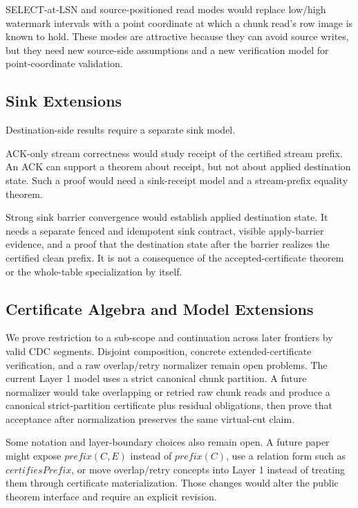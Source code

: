 \documentclass[letterpaper,10pt,twocolumn]{article}
\newcommand{\CleanPrefix}{\mathit{prefix}}
\begin{document}
SELECT-at-LSN and source-positioned read modes would replace low/high
watermark intervals with a point coordinate at which
a chunk read's row image is known to hold. These modes are attractive
because they can avoid source writes, but they need new source-side
assumptions and a new verification model for point-coordinate validation.

\subsection{Sink Extensions}\label{sink-extensions}

Destination-side results require a separate sink model.

ACK-only stream correctness would study receipt of the certified
stream prefix. An ACK can support a theorem about receipt, but not about
applied destination state. Such a proof would need a sink-receipt model
and a stream-prefix equality theorem.

Strong sink barrier convergence would establish applied destination
state. It needs a separate fenced and idempotent sink
contract, visible apply-barrier evidence, and a proof that the
destination state after the barrier realizes the certified clean
prefix. It is not a consequence of the accepted-certificate theorem
or the whole-table specialization by itself.

\subsection{Certificate Algebra and Model
Extensions}\label{certificate-algebra-and-model-extensions}

We prove restriction to a sub-scope and continuation across later
frontiers by valid CDC segments. Disjoint composition, concrete
extended-certificate verification, and a raw overlap/retry normalizer
remain open problems. The current Layer 1 model uses a strict canonical
chunk partition. A future normalizer would take overlapping or retried
raw chunk reads and produce a canonical strict-partition certificate plus
residual obligations, then prove that acceptance after normalization
preserves the same virtual-cut claim.

Some notation and layer-boundary choices also remain open. A
future paper might expose $\CleanPrefix(C,E)$ instead of
$\CleanPrefix(C)$, use a relation form such as
$\mathit{certifiesPrefix}$, or move overlap/retry concepts into Layer 1
instead of treating them through certificate materialization. Those
changes would alter the public theorem interface and require an explicit
revision.
\end{document}
